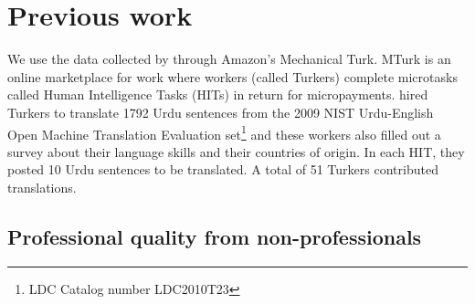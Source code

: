 \documentclass[11pt]{article}
\begin{document}
\section{Previous work}
We use the data collected by   through Amazon's Mechanical Turk. MTurk is an online marketplace for work where workers (called Turkers) complete microtasks called Human Intelligence Tasks (HITs) in return for micropayments.   hired Turkers to translate 1792 Urdu sentences 
from the  2009 NIST Urdu-English Open Machine Translation Evaluation set\footnote{LDC Catalog number LDC2010T23} and these workers also filled out a survey about their language skills and their countries of origin. In each HIT, they posted 10 Urdu sentences to be translated. A total of 51 Turkers contributed translations. 



\subsection{Professional quality from non-professionals}
\end{document}
